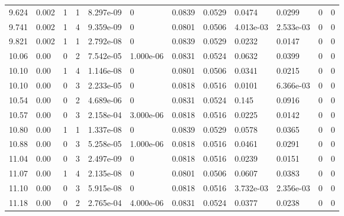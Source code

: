 \documentclass[preview]{standalone}
\begin{document}
{{{\begin{tabular}{L{1.2cm}C{1.2cm} C{0.3cm}C{0.5cm} C{1.4cm}C{1.4cm} C{1.4cm}C{1.4cm} C{1.6cm}C{1.6cm} C{1.6cm}C{1.6cm}}
  9.624  &  0.002  & 1     &  1 &  8.297e-09  & 0  &  0.0839&   0.0529& 0.0474 & 0.0299   &  0 & 0  \\ 
  9.741  &  0.002  & 1     &  4 &  9.359e-09  & 0  &  0.0801&   0.0506& 4.013e-03 & 2.533e-03   &  0 & 0  \\ 
  9.821  &  0.002  & 1     &  1 &  2.792e-08  & 0  &  0.0839&   0.0529& 0.0232 & 0.0147   &  0 & 0  \\ 
  10.06  &  0.00  & 0     &  2 &  7.542e-05  & 1.000e-06  &  0.0831&   0.0524& 0.0632 & 0.0399   &  0 & 0  \\ 
  10.10  &  0.00  & 1     &  4 &  1.146e-08  & 0  &  0.0801&   0.0506& 0.0341 & 0.0215   &  0 & 0  \\ 
  10.10  &  0.00  & 0     &  3 &  2.233e-05  & 0  &  0.0818&   0.0516& 0.0101 & 6.366e-03   &  0 & 0  \\ 
  10.54  &  0.00  & 0     &  2 &  4.689e-06  & 0  &  0.0831&   0.0524& 0.145 & 0.0916   &  0 & 0  \\ 
  10.57  &  0.00  & 0     &  3 &  2.158e-04  & 3.000e-06  &  0.0818&   0.0516& 0.0225 & 0.0142   &  0 & 0  \\ 
  10.80  &  0.00  & 1     &  1 &  1.337e-08  & 0  &  0.0839&   0.0529& 0.0578 & 0.0365   &  0 & 0  \\ 
  10.88  &  0.00  & 0     &  3 &  5.258e-05  & 1.000e-06  &  0.0818&   0.0516& 0.0461 & 0.0291   &  0 & 0  \\ 
  11.04  &  0.00  & 0     &  3 &  2.497e-09  & 0  &  0.0818&   0.0516& 0.0239 & 0.0151   &  0 & 0  \\ 
  11.07  &  0.00  & 1     &  4 &  2.135e-08  & 0  &  0.0801&   0.0506& 0.0607 & 0.0383   &  0 & 0  \\ 
  11.10  &  0.00  & 0     &  3 &  5.915e-08  & 0  &  0.0818&   0.0516& 3.732e-03 & 2.356e-03   &  0 & 0  \\ 
  11.18  &  0.00  & 0     &  2 &  2.765e-04  & 4.000e-06  &  0.0831&   0.0524& 0.0377 & 0.0238   &  0 & 0  \\ 
\hline 
\end{tabular} 

}}}
\end{document}

